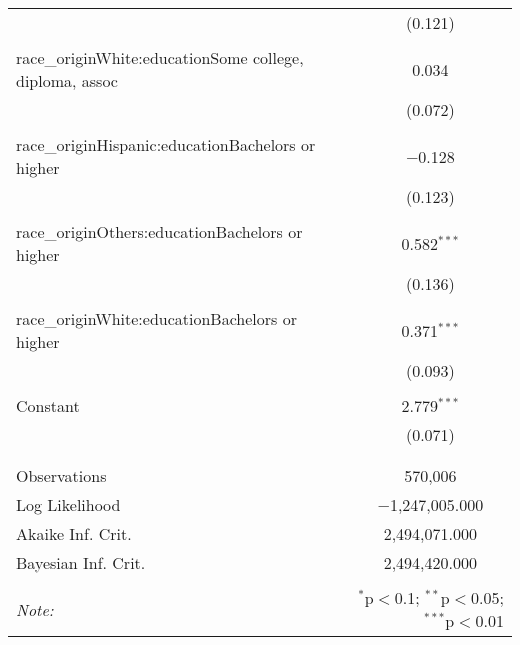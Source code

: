 \begin{table}[!htbp]
\begin{tabular}{@{\extracolsep{5pt}}lc}
  & (0.121) \\ 
  & \\ 
 race\_originWhite:educationSome college, diploma, assoc & 0.034 \\ 
  & (0.072) \\ 
  & \\ 
 race\_originHispanic:educationBachelors or higher & $-$0.128 \\ 
  & (0.123) \\ 
  & \\ 
 race\_originOthers:educationBachelors or higher & 0.582$^{***}$ \\ 
  & (0.136) \\ 
  & \\ 
 race\_originWhite:educationBachelors or higher & 0.371$^{***}$ \\ 
  & (0.093) \\ 
  & \\ 
 Constant & 2.779$^{***}$ \\ 
  & (0.071) \\ 
  & \\ 
\hline \\[-1.8ex] 
Observations & 570,006 \\ 
Log Likelihood & $-$1,247,005.000 \\ 
Akaike Inf. Crit. & 2,494,071.000 \\ 
Bayesian Inf. Crit. & 2,494,420.000 \\ 
\hline 
\hline \\[-1.8ex] 
\textit{Note:}  & \multicolumn{1}{r}{$^{*}$p$<$0.1; $^{**}$p$<$0.05; $^{***}$p$<$0.01} \\ 
\end{tabular} 
\end{table} 

